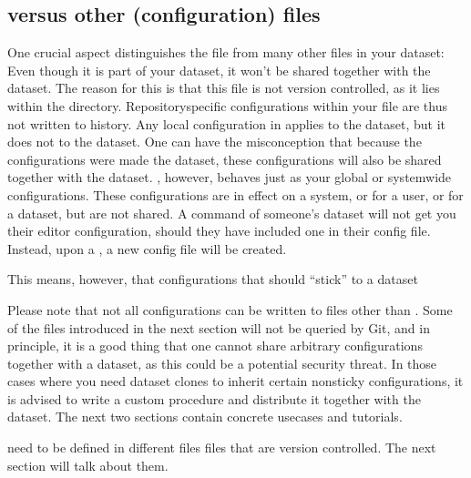 \subsection{ versus other (configuration) files}
\label{\detokenize{basics/101-122-config:git-config-versus-other-configuration-files}}
\sphinxAtStartPar
One crucial aspect distinguishes the  file from many other files
in your dataset: Even though it is part of your dataset, it won’t be shared together
with the dataset. The reason for this is that this file is not version
controlled, as it lies within the  directory.
Repository\sphinxhyphen{}specific configurations within your 
file are thus not written to history. Any local configuration in 
applies to the dataset, but it does not  to the dataset.
One can have the misconception that because the configurations were made 
the dataset, these configurations will also be shared together with the dataset.
, however, behaves just as your global or system\sphinxhyphen{}wide configurations.
These configurations are in effect on a system, or for a user, or for a dataset,
but are not shared.
A  command of someone’s dataset will not get you their
editor configuration, should they have included one in their config file.
Instead, upon a , a new config file will be created.

\sphinxAtStartPar
This means, however, that configurations that should “stick” to a dataset%
\begin{footnote}\sphinxAtStartFootnote
Please note that not all configurations can be written to files other than .
Some of the files introduced in the next section will not be queried by Git, and in principle, it is a good thing that one cannot share arbitrary configurations together with a dataset, as this could be a potential security threat.
In those cases where you need dataset clones to inherit certain non\sphinxhyphen{}sticky configurations, it is advised to write a custom procedure and distribute it together with the dataset.
The next two sections contain concrete usecases and tutorials.
%
\end{footnote}
need to be defined in different files \textendash{} files that are version controlled.
The next section will talk about them.

